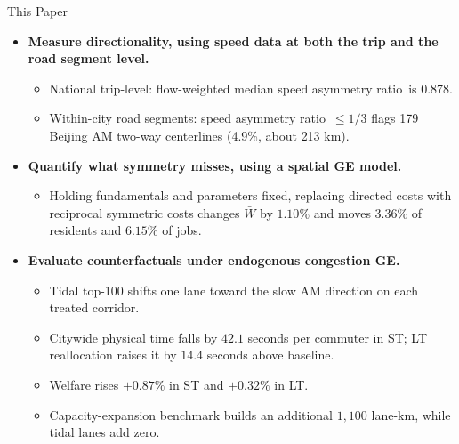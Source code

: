 \documentclass[11pt,aspectratio=169]{beamer}
\newcommand{\good}[1]{\textcolor{blue!70!black}{#1}}
\newcommand{\bad}[1]{\textcolor{red!70!black}{#1}}
\newcommand{\SAR}{speed asymmetry ratio}
\begin{document}
\begin{frame}{This Paper}
\small
\begin{itemize}
  \item \textbf{Measure directionality, using speed data at both the trip and the road segment level.}
  \begin{itemize}\footnotesize
    \item National trip-level: flow-weighted median \SAR\ is \good{0.878}.
    \item Within-city road segments: \SAR\ $\leq1/3$ flags \good{179} Beijing AM two-way centerlines (\good{4.9\%}, about \good{213 km}).
  \end{itemize}
  \item \textbf{Quantify what symmetry misses, using a spatial GE model.}
  \begin{itemize}\footnotesize
    \item Holding fundamentals and parameters fixed, replacing directed costs with reciprocal symmetric costs changes $\bar W$ by \good{$1.10\%$} and moves \good{$3.36\%$} of residents and \good{$6.15\%$} of jobs.
  \end{itemize}
  \item \textbf{Evaluate counterfactuals under endogenous congestion GE.}
  \begin{itemize}\footnotesize
    \item Tidal top-100 shifts one lane toward the slow AM direction on each treated corridor.
    \item Citywide physical time falls by \good{$42.1$ seconds per commuter} in ST; LT reallocation raises it by \bad{$14.4$ seconds} above baseline.
    \item Welfare rises \good{$+0.87\%$} in ST and \good{$+0.32\%$} in LT.
    \item Capacity-expansion benchmark builds an additional \good{$1{,}100$ lane-km}, while tidal lanes add \good{zero}.
  \end{itemize}
\end{itemize}
\end{frame}
\end{document}
